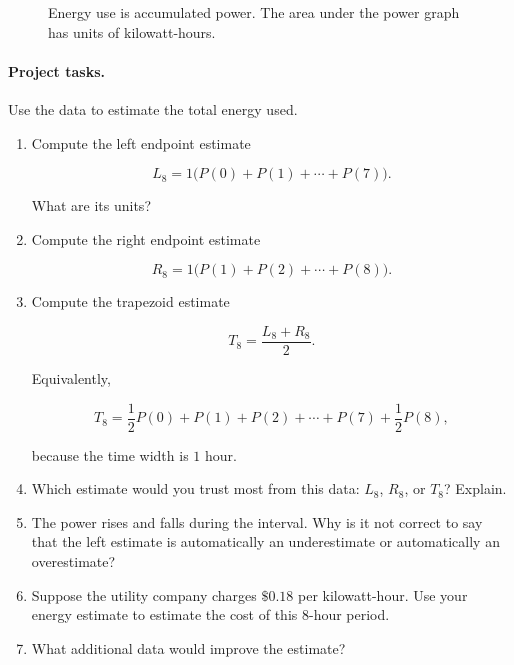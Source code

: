 \begin{figure}[h]
\centering
{}
\caption{Energy use is accumulated power.  The area under the power graph has units of kilowatt-hours.}
\label{fig:power-data-energy-project}
\end{figure}

\paragraph{Project tasks.}
Use the data to estimate the total energy used.

\begin{enumerate}
\item Compute the left endpoint estimate

\[
L_8=
1\bigl(P(0)+P(1)+\cdots+P(7)\bigr).
\]

What are its units?

\item Compute the right endpoint estimate

\[
R_8=
1\bigl(P(1)+P(2)+\cdots+P(8)\bigr).
\]

\item Compute the trapezoid estimate

\[
T_8=\frac{L_8+R_8}{2}.
\]

Equivalently,

\[
T_8=
\frac12P(0)+P(1)+P(2)+\cdots+P(7)+\frac12P(8),
\]

because the time width is \(1\) hour.

\item Which estimate would you trust most from this data: \(L_8\), \(R_8\), or \(T_8\)?
Explain.

\item The power rises and falls during the interval.  Why is it not correct to say that
the left estimate is automatically an underestimate or automatically an overestimate?

\item Suppose the utility company charges \(\$0.18\) per kilowatt-hour.  Use your
energy estimate to estimate the cost of this \(8\)-hour period.

\item What additional data would improve the estimate?
\end{enumerate}


